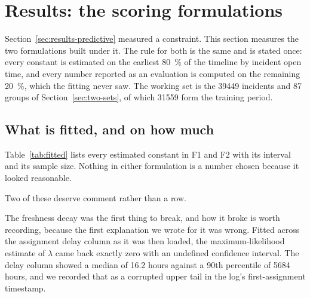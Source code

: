 
\section{Results: the scoring formulations}
\label{sec:formulation-results}

Section~\ref{sec:results-predictive} measured a constraint. This section measures the two
formulations built under it. The rule for both is the same and is stated once: every constant
is estimated on the earliest \SI{80}{\percent} of the timeline by incident open time, and every
number reported as an evaluation is computed on the remaining \SI{20}{\percent}, which the
fitting never saw. The working set is the \num{39449} incidents and \num{87} groups of
Section~\ref{sec:two-sets}, of which \num{31559} form the training period.

\subsection{What is fitted, and on how much}

Table~\ref{tab:fitted} lists every estimated constant in F1 and F2 with its interval and its
sample size. Nothing in either formulation is a number chosen because it looked reasonable.

\begin{table}[htbp]
\centering
\caption{Every fitted constant in the two formulations. Intervals are \SI{95}{\percent}. All
estimation uses training-period cases only.}
\label{tab:fitted}
\small


\end{table}

Two of these deserve comment rather than a row.

The freshness decay was the first thing to break, and how it broke is worth recording,
because the first explanation we wrote for it was wrong. Fitted across the assignment delay
column as it was then loaded, the maximum-likelihood estimate of $\lambda$ came back exactly
zero with an undefined confidence interval. The delay column showed a median of \num{16.2} hours
against a 90th percentile of \num{5684} hours, and we recorded that as a corrupted upper tail in
the log's first-assignment timestamp.

